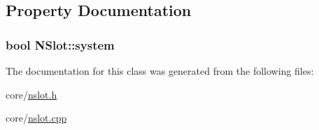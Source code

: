 \subsection{Property Documentation}
\hypertarget{class_n_slot_a1a1ec8abc56fa1de748d75ccf11cc524}{
\subsubsection[{system}]{\setlength{\rightskip}{0pt plus 5cm}bool NSlot::system}}
\label{class_n_slot_a1a1ec8abc56fa1de748d75ccf11cc524}


The documentation for this class was generated from the following files:\begin{DoxyCompactItemize}
\item 
core/\hyperlink{nslot_8h}{nslot.h}\item 
core/\hyperlink{nslot_8cpp}{nslot.cpp}\end{DoxyCompactItemize}
